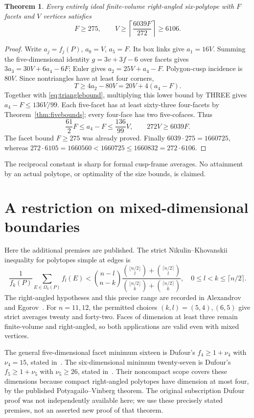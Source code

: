 \documentclass[11pt]{article}
\newtheorem{theorem}{Theorem}[section]
\theoremstyle{remark}
\begin{document}
\begin{theorem}\label{thm:sixbounds}
Every entirely ideal finite-volume right-angled six-polytope with $F$
facets and $V$ vertices satisfies
\[
 F\ge275,\qquad V\ge\left\lceil\frac{6039F}{272}\right\rceil
 \ge6106.
\]
\end{theorem}
\begin{proof}
Write $a_j=f_j(P)$, $a_0=V$, $a_5=F$. Its box links give $a_1=16V$.
Summing the five-dimensional identity $g=3v+3f-6$ over facets gives
$3a_3=30V+6a_4-6F$; Euler gives $a_2=25V+a_4-F$.
Polygon-cusp incidence is $80V$. Since nontriangles have at least
four corners,
\[
 T\ge4a_2-80V=20V+4(a_4-F).
\]
Together with \eqref{eq:trianglebound}, multiplying this lower bound
by THREE gives $a_4-F\le136V/99$. Each five-facet has at least
sixty-three four-facets by Theorem~\ref{thm:fivebounds}; every four-face
has two five-cofaces. Thus
\[
 \frac{61}{2}F\le a_4-F\le\frac{136}{99}V,
 \qquad 272V\ge6039F.
\]
The facet bound $F\ge275$ was already proved. Finally
$6039\cdot275=1660725$, whereas
$272\cdot6105=1660560<1660725\le1660832=272\cdot6106$.
\end{proof}

The reciprocal constant is sharp for formal cusp-frame averages. No
attainment by an actual polytope, or optimality of the size bounds, is
claimed.

\section{A restriction on mixed-dimensional boundaries}\label{sec:mixed}

Here the additional premises are published. The strict
Nikulin--Khovanskii inequality for polytopes simple at edges is
\[
 \frac1{f_k(P)}\sum_{E\in\Omega_k(P)}f_l(E)
 <\binom{n-l}{n-k}
 \frac{\binom{\lfloor n/2\rfloor}{l}+\binom{\lceil n/2\rceil}{l}}
 {\binom{\lfloor n/2\rfloor}{k}+\binom{\lceil n/2\rceil}{k}},
 \quad 0\le l<k\le\lceil n/2\rceil.
\]
The right-angled hypotheses and this precise range are recorded in
Alexandrov~\cite[\S\S2,6]{A} and Egorov~\cite{E}. For $n=11,12$,
the permitted choices $(k,l)=(5,4),(6,5)$ give strict averages twenty
and forty-two. Faces of dimension at least three remain finite-volume
and right-angled, so both applications are valid even with mixed vertices.

The general five-dimensional facet minimum sixteen is Dufour's
$f_4\ge1+\nu_4$ with $\nu_4=15$, stated in~\cite[Lemma~2.3]{E}.
The six-dimensional minimum twenty-seven is Dufour's
$f_5\ge1+\nu_5$ with $\nu_5\ge26$, stated in~\cite[Proposition~6.5]{A}.
Their noncompact scope covers these dimensions because compact
right-angled polytopes have dimension at most four, by the published
Potyagailo--Vinberg theorem. The original subscription Dufour proof was
not independently available here; we use these precisely stated premises,
not an asserted new proof of that theorem.
\end{document}
